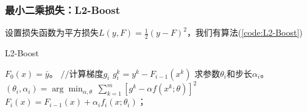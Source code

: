           \subsubsection{最小二乘损失：L2-Boost}
              \par
              设置损失函数为平方损失$L(y,F) = \frac{1}{2}(y-F)^2$，我们有算法(\ref{code:L2-Boost})
              \begin{algorithm}[H]
                  \caption{L2-Boost}\label{code:L2-Boost}
                  \begin{algorithmic}[1]
                      \State $F_0(x) = \bar{y}$。
                          \State $//$计算梯度$g_i$
                              \State $g_i^k = y^k - F_{i-1}(x^k)$
                          \EndFor
                          \State 求参数$\theta_i$和步长$\alpha_i$。$(\theta_i,\alpha_i) = \arg\min_{\alpha,\theta} \ \sum_{k=1}^m [g^k - \alpha f(x^k;\theta)]^2$
                          \State $F_i(x) = F_{i-1}(x)+\alpha_i f_i(x;\theta_i)$；
                      \EndFor
                  \end{algorithmic}
              \end{algorithm}
